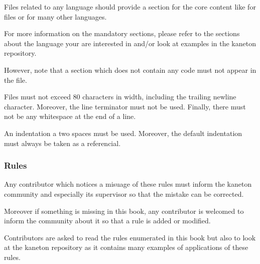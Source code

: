 Files related to any language should provide a section for the core
content like  for  files or 
for many other languages.

For more information on the mandatory sections, please refer to
the sections about the language your are interested in and/or look at
examples in the kaneton repository.

However, note that a section which does not contain any code must not
appear in the file.

Files must not exceed $80$ characters in width, including the trailing newline
character. Moreover, the   line terminator must not be
used. Finally, there must not be any whitespace at the end of a line.

An indentation a two spaces must be used. Moreover, the 
default indentation must always be taken as a referencial.


\subsubsection{Rules}

Any contributor which notices a misuage of these rules must inform the
kaneton community and especially its supervisor so that the mistake can be
corrected.

Moreover if something is missing in this book, any contributor is welcomed
to inform the community about it so that a rule is added or modified.

Contributors are asked to read the rules enumerated in this book but also
to look at the kaneton repository as it contains many examples of applications
of these rules.

